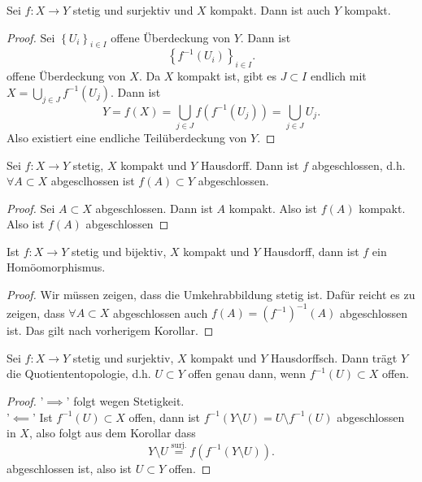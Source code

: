 \begin{theorem}
    Sei $f: X \to  Y$ stetig und surjektiv und $X$ kompakt. Dann ist auch  $Y$ kompakt. 
    \label{thm:image-of-compact-space-is-compact}
\end{theorem}
\begin{proof}
    Sei $\left \{U_i\right\} _{i \in I}$ offene Überdeckung von $Y$. Dann ist
     \[
         \left \{f^{-1}(U_i)\right\} _{i \in I}
    .\] 
    offene Überdeckung von $X$. Da  $X$ kompakt ist, gibt es  $J\subset I$ endlich mit $X = \bigcup_{j\in J} f^{-1}(U_j)$. Dann ist 
    \[
        Y = f(X) = \bigcup_{j\in J} f(f^{-1}(U_j)) = \bigcup_{j\in J} U_j
    .\] 
    Also existiert eine endliche Teilüberdeckung von $Y$.
\end{proof}
\begin{corollary}
    Sei $f: X \to  Y$ stetig, $X$ kompakt und  $Y$ Hausdorff. Dann ist  $f$ abgeschlossen, d.h. $\forall A\subset X$ abgesclhossen ist $f(A) \subset Y$ abgeschlossen.
\end{corollary}
\begin{proof}
    Sei $A\subset X$ abgeschlossen. Dann ist $A$ kompakt. Also ist  $f(A)$ kompakt. Also ist  $f(A)$ abgeschlossen
\end{proof}
\begin{corollary}
    Ist $f: X \to  Y$ stetig und bijektiv, $X$ kompakt und  $Y$ Hausdorff, dann ist  $f$ ein Homöomorphismus.
    \label{cor:compact-to-hausdorff-is-homeomorphism}
\end{corollary}
\begin{proof}
    Wir müssen zeigen, dass die Umkehrabbildung stetig ist. Dafür reicht es zu zeigen, dass $\forall A\subset X$ abgeschlossen auch $f(A) = (f^{-1})^{-1}(A)$ abgeschlossen ist. Das gilt nach vorherigem Korollar.
\end{proof}
\begin{corollary}
    Sei $f: X \to  Y$ stetig und surjektiv, $X$ kompakt und  $Y$ Hausdorffsch. Dann trägt  $Y$ die Quotiententopologie, d.h.  $U\subset Y$ offen genau dann, wenn $f^{-1}(U) \subset X$ offen.
\end{corollary}
\begin{proof}
    '$\implies$' folgt wegen Stetigkeit. \\
    '$\impliedby$' Ist $f^{-1}(U) \subset X$ offen, dann ist $f^{-1}(Y \setminus U ) = U \setminus f^{-1}(U)$ abgeschlossen in $X$, also folgt aus dem Korollar dass
     \[
         Y \setminus U \stackrel{\text{surj.}}{=}   f\left( f^{-1}\left( Y \setminus U \right)  \right) 
    .\] 
    abgeschlossen ist, also ist $U\subset Y$ offen.
\end{proof}
